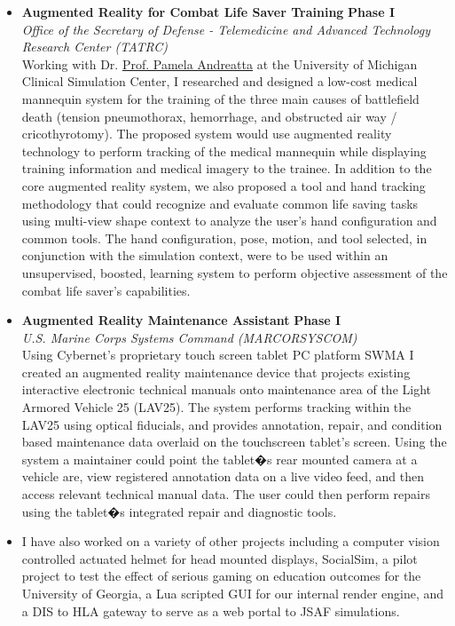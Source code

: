 \documentclass[10pt]{article}
\newenvironment{outerlist}[1][\enskip\textbullet]%
        {\begin{itemize}[#1]}{\end{itemize}%
         \vspace{-.6\baselineskip}}
\newcommand{\blankline}{\quad\pagebreak[2]}
\begin{document}
\begin{outerlist}
{.com/node/12465303/comments}{October 23rd, 2008 edition of The Economist Magazine}. 
\blankline
\item \textbf{Augmented Reality for Combat Life Saver Training}%
        \hfill \textbf{Phase I}\\
        \textit{Office of the Secretary of Defense - Telemedicine and Advanced Technology Research Center (TATRC)} \\
  			Working with Dr. \href{http://www.med.umich.edu/meded/about/profiles/Andreatta.htm}{Prof. Pamela Andreatta} at the University of Michigan Clinical Simulation Center, I researched and designed a low-cost medical mannequin system for the training of the three main causes of battlefield death (tension pneumothorax, hemorrhage, and obstructed air way / cricothyrotomy). The proposed system would use augmented reality technology to perform tracking of the medical mannequin while displaying training information and medical imagery to the trainee. In addition to the core augmented reality system, we also proposed a tool and hand tracking methodology that could recognize and evaluate common life saving tasks using multi-view shape context to analyze the  user's hand configuration and common tools. The hand configuration, pose, motion, and tool selected, in conjunction with the simulation context, were to be used within an unsupervised, boosted, learning system to perform objective assessment of the combat life saver's capabilities.
\blankline
\item \textbf{Augmented Reality Maintenance Assistant}%
        \hfill \textbf{Phase I}\\
        \textit{U.S. Marine Corps Systems Command (MARCORSYSCOM)} \\
				Using Cybernet's proprietary touch screen tablet PC platform SWMA I created an augmented reality maintenance device that projects existing interactive electronic technical manuals onto maintenance area of the Light Armored Vehicle 25 (LAV25). The system performs tracking within the LAV25 using optical fiducials, and provides annotation, repair, and condition based maintenance data overlaid on the touchscreen tablet's screen. Using the system a maintainer could point the tablet�s rear mounted camera at a vehicle are, view registered annotation data on a live video feed, and then access relevant technical manual data. The user could then perform repairs using the tablet�s integrated repair and diagnostic tools.
\blankline                       
\item I have also worked on a variety of other projects including a computer vision controlled actuated helmet for head mounted displays, SocialSim, a pilot project to test the effect of serious gaming on education outcomes for the University of Georgia, a Lua scripted GUI for our internal render engine, and a DIS to HLA gateway to serve as a web portal to JSAF simulations. 
\end{outerlist}
\end{document}
